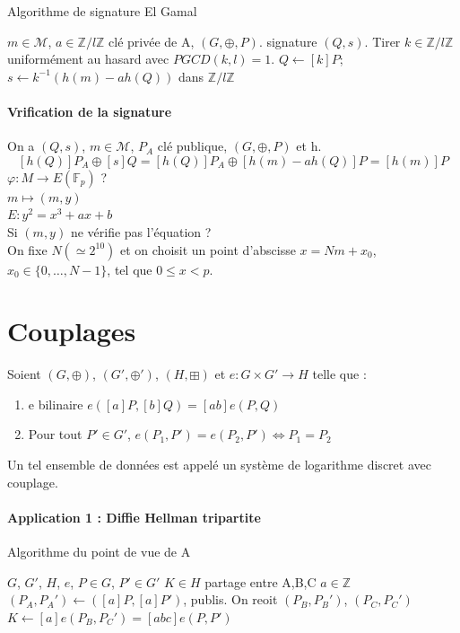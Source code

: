 \documentclass[12pt,a4paper]{report}
\begin{document}
 \begin{algorithm}[ht]
\caption{Algorithme de signature El Gamal}
\begin{algorithmic}[1]
\REQUIRE $m \in \mathcal{M}$, $a \in \mathbb{Z}/l\mathbb{Z}$ clé privée de A, $(G,\oplus,P)$.
\ENSURE signature $(Q,s)$.
\STATE Tirer $k \in \mathbb{Z}/l\mathbb{Z}$ uniformément au hasard avec $PGCD(k,l)=1$.
\STATE $Q \leftarrow [k]P$;
\STATE $ s \leftarrow k^{-1}(h(m)-ah(Q))$ dans $\mathbb{Z}/l\mathbb{Z}$
\end{algorithmic}
\end{algorithm}


\paragraph{Vrification de la signature}
On a $(Q,s)$, $m \in \mathcal{M}$, $P_A$ clé publique, $(G,\oplus,P)$ et h.
$$ [h(Q)]P_A \oplus [s]Q = [h(Q)]P_A \oplus [h(m)-ah(Q)]P=[h(m)]P$$
$ \varphi : M \rightarrow E(\mathbb{F}_p) $ ?\\
			$ m \mapsto (m,y)$\\
$E : y^2 = x^3+ax+b$\\
Si $(m,y)$ ne vérifie pas l'équation ?\\
On fixe $N (\simeq 2^{10})$ et on choisit un point d'abscisse $ x= Nm+x_0$, $x_0 \in \{0,\ldots,N-1\}$, tel que $0\leqslant x < p$.
\section{Couplages}
Soient $(G,\oplus)$, $(G',\oplus')$, $(H,\boxplus)$ et $e : G\times G' \rightarrow H$ telle que :
\begin{enumerate}
\item e bilinaire $ e([a]P,[b]Q)= [ab]e(P,Q)$
\item Pour tout $P' \in G'$, $e(P_1,P') = e(P_2,P') \Leftrightarrow P_1=P_2$
\end{enumerate}
Un tel ensemble de données est appelé un système de logarithme discret avec couplage.
\paragraph{Application 1 : Diffie Hellman tripartite\\}
 \begin{algorithm}[ht]
\caption{Algorithme du point de vue de A}
\begin{algorithmic}[1]
\REQUIRE $G$, $G'$, $H$, $e$, $P \in G$, $P' \in G'$
\ENSURE $K \in H$ partage entre A,B,C
\STATE $a \in \mathbb{Z}$
\STATE $(P_A,P_A') \leftarrow ([a]P,[a]P')$, publis.
\STATE On reoit $(P_B,P_B')$, $(P_C,P_C')$
\STATE $K \leftarrow [a]e(P_B,P_C') = [abc]e(P,P')$
\end{algorithmic}
\end{algorithm}
\end{document}

